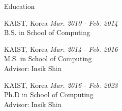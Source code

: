 
\begin{rSection}{Education}

KAIST, Korea \hfill {\em Mar. 2010 - Feb. 2014} \\
B.S. in School of Computing

KAIST, Korea \hfill {\em Mar. 2014 - Feb. 2016} \\
M.S. in School of Computing \\
Advisor: Insik Shin

KAIST, Korea \hfill {\em Mar. 2016 - Feb. 2023} \\
Ph.D in School of Computing \\
Advisor: Insik Shin

\end{rSection}
